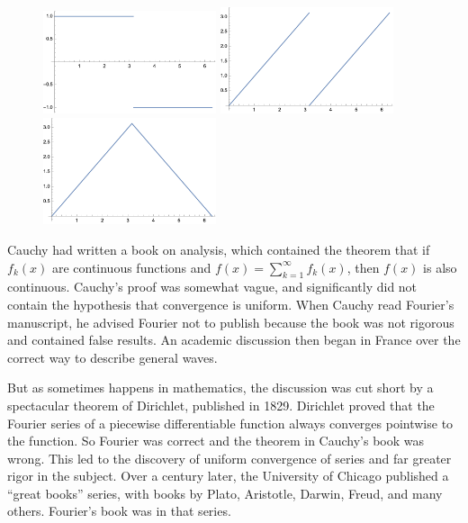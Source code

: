 \documentclass[11pt, oneside]{amsart}
\begin{document}
\begin{figure}[htbp] %
   \centering
   \includegraphics[width=2in]{Graphics/square} \hspace{.5in}   \includegraphics[width=2in]{Graphics/sawtooth}
    \hspace{.5in}   \includegraphics[width=2in]{Graphics/wedge}
\end{figure}

Cauchy had written a book on analysis, which contained the theorem that if $f_k(x)$ are continuous functions and $f(x) = \sum_{k = 1}^\infty f_k(x)$, then $f(x)$ is also continuous. Cauchy's proof was somewhat vague, and significantly did not contain the hypothesis that convergence is uniform. When Cauchy read Fourier's manuscript, he advised Fourier not to publish because the book was not rigorous and contained  false results. An academic discussion then began in France over the correct way to describe general waves.

But as sometimes happens in mathematics, the discussion was cut short by a spectacular theorem of Dirichlet, published in 1829. Dirichlet proved that the Fourier series of a piecewise differentiable function always converges pointwise to the function. So Fourier was correct and the theorem in Cauchy's book was wrong. This led to the discovery of uniform convergence of series and far greater rigor in the subject. Over a century later, the University of Chicago published a ``great books'' series, with books by Plato, Aristotle, Darwin, Freud, and many others. Fourier's book was in that series.
\end{document}
